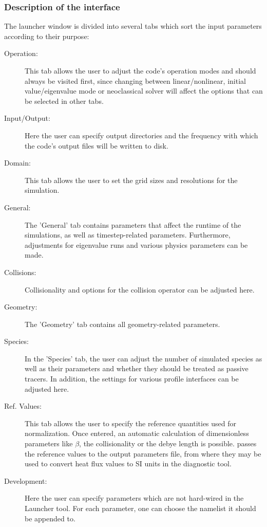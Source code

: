 \documentclass[12pt]{article}
\begin{document}
\subsubsection{Description of the interface}
The launcher window is divided into several tabs which sort the input parameters according to their purpose: 
\begin{description}
\item[Operation:] This tab allows the user to adjust the \gene code's operation modes and 
 should always be visited first, since changing between linear/nonlinear, initial value/eigenvalue mode or
 neoclassical solver will affect the options that can be selected in other tabs.
\item[Input/Output:] Here the user can specify output directories and the frequency with 
  which the code's output files will be written to disk.
\item[Domain:] This tab allows the user to set the grid sizes and resolutions for the simulation.
\item[General:] The 'General' tab contains parameters that affect the runtime of the 
  simulations, as well as timestep-related parameters. Furthermore, adjustments for eigenvalue 
  runs and various physics parameters can be made. 
\item[Collisions:] Collisionality and options for the collision operator can be adjusted here.
\item[Geometry:] The 'Geometry' tab contains all geometry-related parameters.
\item[Species:] In the 'Species' tab, the user can adjust the number of simulated species as 
  well as their parameters and whether they should be treated as passive tracers. In addition,
  the settings for various profile interfaces can be adjusted here.
\item[Ref. Values:] This tab allows the user to specify the reference quantities used for 
  normalization. Once entered, an automatic calculation of dimensionless parameters like 
  $\beta$, the collisionality or the debye length is possible. \gene passes 
  the reference values to the output parameters file, from where they may be used to convert 
  heat flux values to SI units in the diagnostic tool.
\item[Development:] Here the user can specify parameters which are not hard-wired in the Launcher 
  tool. For each parameter, one can choose the namelist it should be appended to.
\end{description}
\end{document}
